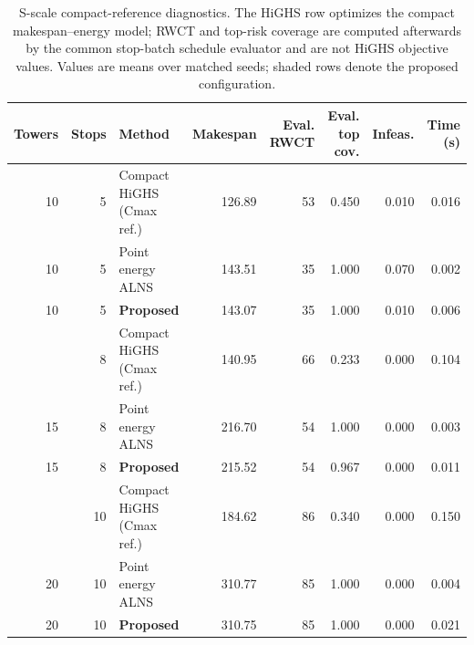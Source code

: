 ﻿\begin{table}[H]
\centering
\caption{S-scale compact-reference diagnostics. The HiGHS row optimizes the compact makespan--energy model; RWCT and top-risk coverage are computed afterwards by the common stop-batch schedule evaluator and are not HiGHS objective values. Values are means over matched seeds; shaded rows denote the proposed configuration.}
\label{tab:small-reference}
\small
\setlength{\tabcolsep}{3.0pt}
\begin{tabular*}{\textwidth}{@{\extracolsep{\fill}}rrlrrrrr@{}}
\toprule
Towers & Stops & Method & Makespan & Eval. RWCT & Eval. top cov. & Infeas. & Time (s) \\
\midrule
10 & 5 & Compact HiGHS (Cmax ref.) & 126.89 & 53 & 0.450 & 0.010 & 0.016 \\
10 & 5 & Point energy ALNS & 143.51 & 35 & 1.000 & 0.070 & 0.002 \\
\rowcolor{gray!10}
10 & 5 & \textbf{Proposed} & 143.07 & 35 & 1.000 & 0.010 & 0.006 \\
\addlinespace[2pt]
15 & 8 & Compact HiGHS (Cmax ref.) & 140.95 & 66 & 0.233 & 0.000 & 0.104 \\
15 & 8 & Point energy ALNS & 216.70 & 54 & 1.000 & 0.000 & 0.003 \\
\rowcolor{gray!10}
15 & 8 & \textbf{Proposed} & 215.52 & 54 & 0.967 & 0.000 & 0.011 \\
\addlinespace[2pt]
20 & 10 & Compact HiGHS (Cmax ref.) & 184.62 & 86 & 0.340 & 0.000 & 0.150 \\
20 & 10 & Point energy ALNS & 310.77 & 85 & 1.000 & 0.000 & 0.004 \\
\rowcolor{gray!10}
20 & 10 & \textbf{Proposed} & 310.75 & 85 & 1.000 & 0.000 & 0.021 \\
\bottomrule
\end{tabular*}
\end{table}
